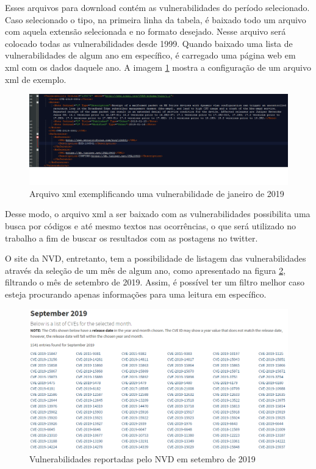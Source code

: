 Esses arquivos para download contém as vulnerabilidades do período selecionado. Caso selecionado o tipo, na primeira linha da tabela, é baixado todo um arquivo com aquela extensão selecionada e no formato desejado. Nesse arquivo será colocado todas as vulnerabilidades desde 1999. Quando baixado uma lista de vulnerabilidades de algum ano em específico, é carregado uma página web em xml com os dados daquele ano. A imagem \ref{fig:cve1_detalhes} mostra a configuração de um arquivo xml de exemplo.

\begin{figure}[H]
\centering
\includegraphics[width=1\textwidth]{imagens/cve1_detalhes.png}
\caption{Arquivo xml exemplificando uma vulnerabilidade de janeiro de 2019}
\label{fig:cve1_detalhes}
\end{figure}

Desse modo, o arquivo xml a ser baixado com as vulnerabilidades possibilita uma busca por códigos e até mesmo textos nas ocorrências, o que será utilizado no trabalho a fim de buscar os resultados com as postagens no twitter.

O site da NVD, entretanto, tem a possibilidade de listagem das vulnerabilidades através da seleção de um mês de algum ano, como apresentado na figura \ref{fig:nvd1}, filtrando o mês de setembro de 2019. Assim, é possível ter um filtro melhor caso esteja procurando apenas informações para uma leitura em específico.

\begin{figure}[H]
\centering
\includegraphics[width=1\textwidth]{imagens/nvd_exemplo1.png}
\caption{Vulnerabilidades reportadas pelo NVD em setembro de 2019}
\label{fig:nvd1}
\end{figure}

